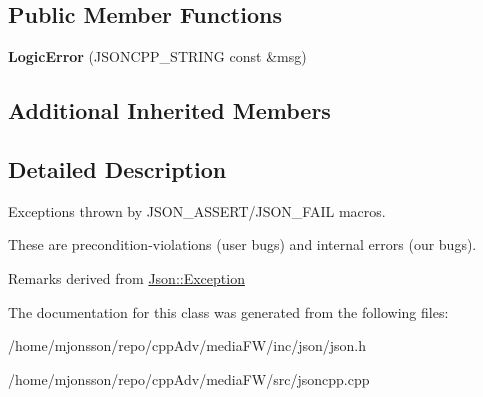 \subsection*{Public Member Functions}
\begin{DoxyCompactItemize}
\item 
\mbox{\label{classJson_1_1LogicError_acca679aa49768a4a1de7b705c67c2919}} 
{\bfseries Logic\+Error} (J\+S\+O\+N\+C\+P\+P\+\_\+\+S\+T\+R\+I\+NG const \&msg)
\end{DoxyCompactItemize}
\subsection*{Additional Inherited Members}


\subsection{Detailed Description}
Exceptions thrown by J\+S\+O\+N\+\_\+\+A\+S\+S\+E\+R\+T/\+J\+S\+O\+N\+\_\+\+F\+A\+IL macros.

These are precondition-\/violations (user bugs) and internal errors (our bugs).

\begin{DoxyRemark}{Remarks}
derived from \hyperlink{classJson_1_1Exception}{Json\+::\+Exception} 
\end{DoxyRemark}


The documentation for this class was generated from the following files\+:\begin{DoxyCompactItemize}
\item 
/home/mjonsson/repo/cpp\+Adv/media\+F\+W/inc/json/json.\+h\item 
/home/mjonsson/repo/cpp\+Adv/media\+F\+W/src/jsoncpp.\+cpp\end{DoxyCompactItemize}

